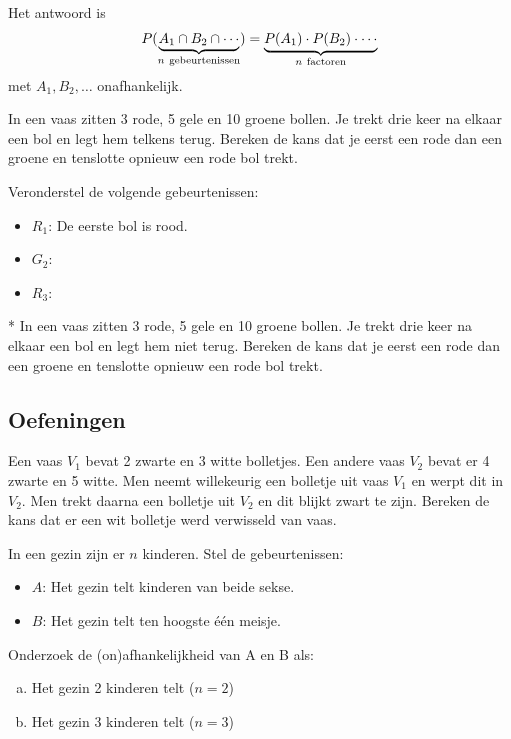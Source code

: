\documentclass[12pt,twoside]{article}
\begin{document}
Het antwoord is
$$P(\underbrace{A_1\cap B_2\cap\cdots}_{n\mbox{ \scriptsize gebeurtenissen}})=\underbrace{P(A_1)\cdot P(B_2)\cdot \cdots}_{n\mbox{ \scriptsize factoren}}$$
met $A_1, B_2, \ldots$ onafhankelijk.

\begin{oefening}
In een vaas zitten 3 rode, 5 gele en 10 groene bollen. Je trekt drie keer na elkaar een bol en legt hem telkens terug. Bereken de kans dat je eerst een rode dan een groene en tenslotte opnieuw een rode bol trekt.

Veronderstel de volgende gebeurtenissen:
\begin{itemize}
  \itemsep0.2em
  \item $R_1$: De eerste bol is rood.
  \item $G_2$: \arulefill
  \item $R_3$: \arulefill
\end{itemize}
\vspace*{0.1cm}
\end{oefening}

\begin{oefening}*
In een vaas zitten 3 rode, 5 gele en 10 groene bollen. Je trekt drie keer na elkaar een bol en legt hem niet terug. Bereken de kans dat je eerst een rode dan een groene en tenslotte opnieuw een rode bol trekt.
\end{oefening}

\subsection{Oefeningen}

\begin{oefening}
Een vaas $V_1$ bevat 2 zwarte en 3 witte bolletjes. Een andere vaas $V_2$ bevat er 4 zwarte
en 5 witte. Men neemt willekeurig een bolletje uit vaas $V_1$ en werpt dit in $V_2$. Men
trekt daarna een bolletje uit $V_2$ en dit blijkt zwart te zijn. Bereken de kans dat er een
wit bolletje werd verwisseld van vaas.
\end{oefening}

\begin{oefening}
In een gezin zijn er $n$ kinderen. Stel de gebeurtenissen:
\begin{itemize}
  \item $A$: Het gezin telt kinderen van beide sekse.
  \item $B$: Het gezin telt ten hoogste één meisje.
\end{itemize}
        Onderzoek de (on)afhankelijkheid van A en B als:
\begin{enumerate}[(a)]
  \item Het gezin 2 kinderen telt ($n = 2$)
  \item Het gezin 3 kinderen telt ($n = 3$)
\end{enumerate}
\end{oefening}
\end{document}
